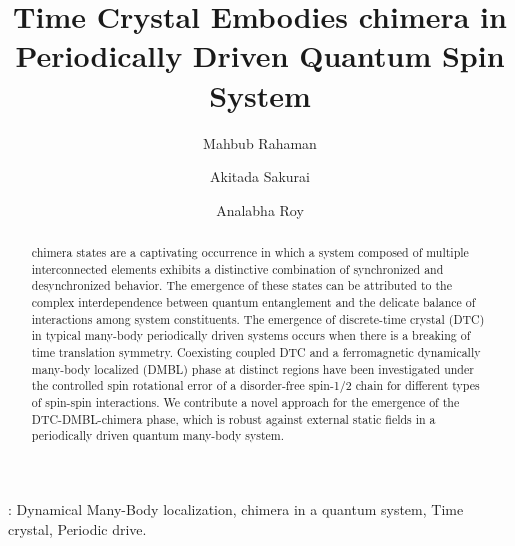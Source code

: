 \documentclass[12pt]{iopart}
\begin{document}
	
	\title{Time Crystal Embodies chimera in Periodically Driven Quantum Spin System}
	\submitto{\NJP}
	\author{Mahbub Rahaman}
	\address{Department of Physics, The University of Burdwan, Burdwan 713104, India}	
	\author{Akitada Sakurai}
	\address{Quantum Information Science and Technology Unit, Okinawa Institute of Science and Technology Graduate University, Onna-son, Okinawa 904-0495, Japan}		
	\author{Analabha Roy}
	\address{Department of Physics, The University of Burdwan, Burdwan 713104, India}
	
	\begin{abstract}
		chimera states are a captivating occurrence in which a system composed of multiple interconnected elements exhibits a distinctive combination of synchronized and desynchronized behavior. The emergence of these states can be attributed to the complex interdependence between quantum entanglement and the delicate balance of interactions among system constituents. The emergence of discrete-time crystal (DTC) in typical many-body periodically driven systems occurs when there is a breaking of time translation symmetry. Coexisting coupled DTC and a ferromagnetic dynamically many-body localized (DMBL) phase at distinct regions have been investigated under the controlled spin rotational error of a disorder-free spin-1/2 chain for different types of spin-spin interactions. We contribute a novel approach for the emergence of the DTC-DMBL-chimera phase, which is robust against external static fields in a periodically driven quantum many-body system.
	\end{abstract}
	: Dynamical Many-Body localization, chimera in a quantum system, Time crystal, Periodic drive. \\        
	\maketitle
	
\end{document}
